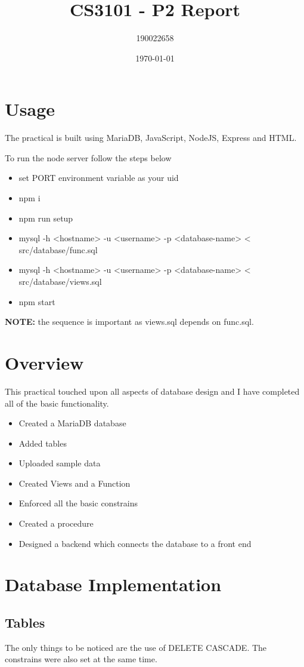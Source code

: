 \documentclass[11pt]{article}
\author{190022658}
\date{\today}
\title{CS3101 - P2 Report}
\begin{document}
\maketitle

\section{Usage}
\label{sec:orgc7b130f}
The practical is built using MariaDB, JavaScript, NodeJS, Express and HTML.

To run the node server follow the steps below
\begin{itemize}
\item set PORT environment variable as your uid
\item npm i
\item npm run setup
\item mysql -h <hostname> -u <username> -p <database-name> < src/database/func.sql
\item mysql -h <hostname> -u <username> -p <database-name> < src/database/views.sql
\item npm start
\end{itemize}

\textbf{NOTE:} the sequence is important as views.sql depends on func.sql.

\section{Overview}
\label{sec:org1b12d76}
This practical touched upon all aspects of database design and I have completed all of the basic functionality.
\begin{itemize}
\item Created a MariaDB database
\item Added tables
\item Uploaded sample data
\item Created Views and a Function
\item Enforced all the basic constrains
\item Created a procedure
\item Designed a backend which connects the database to a front end
\end{itemize}
\section{Database Implementation}
\label{sec:orgdbe751b}
\subsection{Tables}
\label{sec:org42eeef7}
The only things to be noticed are the use of DELETE CASCADE. The constrains were also set at the same time.
\end{document}
